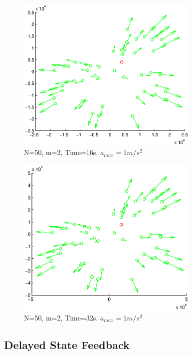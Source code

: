 \documentclass[10pt, conference]{IEEEtran}
\begin{document}
\begin{figure}[!h]
  \begin{center}
    \includegraphics[width=3.45in]{n50m2vmax1000amax1t16}
  \end{center}

  \caption{\small N=50, m=2, Time=16s, $a_{max}=1m/s^2$}
  \label{fig:n50m2vmax1000amax1t16}
\end{figure}

\begin{figure}[!h]
  \begin{center}
    \includegraphics[width=3.45in]{n50m2vmax1000amax1t32}
  \end{center}

  \caption{\small N=50, m=2, Time=32s, $a_{max}=1m/s^2$}
  \label{fig:n50m2vmax1000amax1t32}
\end{figure}

\clearpage

\subsection{Delayed State Feedback}
\end{document}
